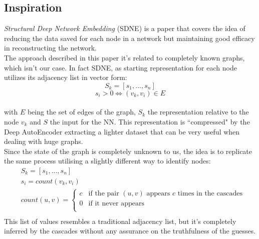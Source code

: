 \documentclass{article}
\begin{document}
			\subsection{Inspiration}
			\textit{Structural Deep Network Embedding} (SDNE) is a paper that covers the idea of reducing the data saved for each node in a network but maintaining good efficacy in reconstructing the network.\\
			The approach described in this paper it's related to completely known graphs, which isn't our case. In fact SDNE, as starting representation for each node utilizes its adjacency list in vector form:
			$$ S_{k} = [s_{1}, ... , s_{n}] $$
			$$ s_{i} > 0 \iff (v_{k},v_{i})\in E $$\\
			with $E$ being the set of edges of the graph, $S_{k}$ the representation relative to the node $v_{k}$ and $S$ the input for the NN. This representation is \textquotedblleft compressed" by the Deep AutoEncoder extracting a lighter dataset that can be very useful when dealing with huge graphs.\\
			Since the state of the graph is completely unknown to us, the idea is to replicate the same process utilising a slightly different way to identify nodes:
			\begin{equation}
			\begin{aligned}
			& S_{k} = [s_{1}, ... , s_{n}]\\
			& s_{i} = count(v_{k},v_{i})\\
			& count(u,v) =
			\begin{cases}
			c & \text{if the pair } (u,v) \text{  appears } c \text{ times in the cascades}\\
			0 & \text{if it never appears}\\
			\end{cases}\\
			\end{aligned}
			\end{equation}
			This list of values resembles a traditional adjacency list, but it's completely inferred by the cascades without any assurance on the truthfulness of the guesses.\\
			
\end{document}
